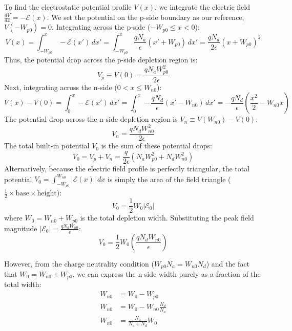To find the electrostatic potential profile $V(x)$, we integrate the electric field $\frac{dV}{dx} = -\mathcal{E}(x)$. We set the potential on the p-side boundary as our reference, $V(-W_{p0}) = 0$.
Integrating across the p-side ($-W_{p0} \leq x < 0$):
\begin{equation*}
    V(x) = \int_{-W_{p0}}^x -\mathcal{E}(x')\,dx' = \int_{-W_{p0}}^x \frac{qN_a}{\epsilon}(x' + W_{p0})\,dx' = \frac{qN_a}{2\epsilon}(x + W_{p0})^2
\end{equation*}
Thus, the potential drop across the p-side depletion region is:
\begin{equation*}
    V_p \equiv V(0) = \frac{qN_a W_{p0}^2}{2\epsilon}
\end{equation*}
Next, integrating across the n-side ($0 < x \le W_{n0}$):
\begin{equation*}
    V(x) - V(0) = \int_0^x -\mathcal{E}(x')\,dx' = \int_0^x -\frac{qN_d}{\epsilon}(x' - W_{n0})\,dx' = -\frac{qN_d}{\epsilon}\left(\frac{x^2}{2} - W_{n0} x\right)
\end{equation*}
The potential drop across the n-side depletion region is $V_n \equiv V(W_{n0}) - V(0)$:
\begin{equation*}
    V_n = \frac{qN_d W_{n0}^2}{2\epsilon}
\end{equation*}
The total built-in potential $V_0$ is the sum of these potential drops:
\begin{equation*}
    V_0 = V_p + V_n = \frac{q}{2\epsilon}\left(N_a W_{p0}^2 + N_d W_{n0}^2\right)
\end{equation*}
Alternatively, because the electric field profile is perfectly triangular, the total potential $V_0 = \int_{-W_{p0}}^{W_{n0}} |\mathcal{E}(x)|\,dx$ is simply the area of the field triangle ($\frac{1}{2} \times \text{base} \times \text{height}$):
\begin{equation*}
    V_0 = \frac{1}{2} W_0 |\mathcal{E}_0|
\end{equation*}
where $W_0 = W_{n0} + W_{p0}$ is the total depletion width. Substituting the peak field magnitude $|\mathcal{E}_0| = \frac{q N_d W_{n0}}{\epsilon}$:
\begin{equation*}
    V_0 = \frac{1}{2} W_0 \left( \frac{qN_d W_{n0}}{\epsilon} \right)
\end{equation*}

However, from the charge neutrality condition ($W_{p0}N_a = W_{n0}N_d$) and the fact that $W_0 = W_{n0} + W_{p0}$, we can express the n-side width purely as a fraction of the total width:
\begin{align*}
    W_{n0} &= W_0 - W_{p0} \\
    W_{n0} &= W_0 - W_{n0}\frac{N_d}{N_a} \\
    W_{n0} &= \frac{N_a}{N_a + N_d} W_0
\end{align*}

